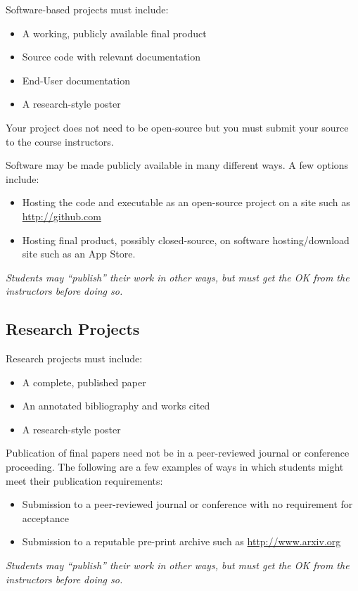 \documentclass[10pt]{article}
\begin{document}
Software-based projects must include:
\begin{itemize}
\item A working, publicly available final product
\item Source code with relevant documentation
\item End-User documentation
\item A research-style poster
\end{itemize}
Your project does not need to be open-source but you must submit your source to the course instructors.

Software may be made publicly available in many different ways.  A few options include:
\begin{itemize}
\item Hosting the code and executable as an open-source project on a site such as \url{http://github.com}
\item Hosting final product, possibly closed-source, on software hosting/download site such as an App Store.
\end{itemize}
\textit{Students may ``publish'' their work in other ways, but must get the OK from the instructors before doing so.}

\subsection{Research Projects}

Research projects must include:
\begin{itemize}
\item A complete, published paper 
\item An annotated bibliography and works cited
\item A research-style poster
\end{itemize}

Publication of final papers need not be in a peer-reviewed journal or conference proceeding.  The following are a few examples of ways in which students might meet their publication requirements:
\begin{itemize}
\item Submission to a peer-reviewed journal or conference with no requirement for acceptance
\item Submission to a reputable pre-print archive such as \url{http://www.arxiv.org}
\end{itemize}
\textit{Students may ``publish'' their work in other ways, but must get the OK from the instructors before doing so.}
\end{document}
